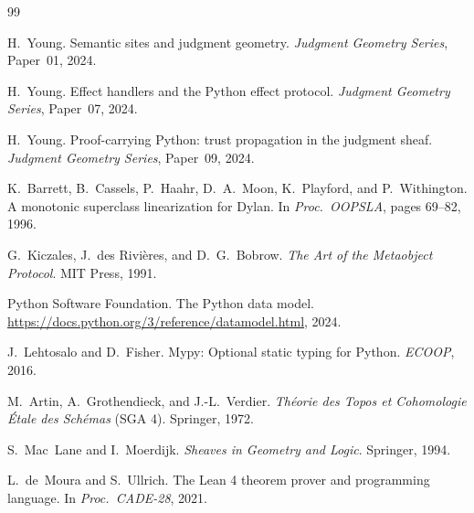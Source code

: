 \documentclass[11pt]{article}
\begin{document}
\begin{thebibliography}{99}

H.~Young.
\newblock Semantic sites and judgment geometry.
\newblock \textit{Judgment Geometry Series}, Paper~01, 2024.

H.~Young.
\newblock Effect handlers and the {Python} effect protocol.
\newblock \textit{Judgment Geometry Series}, Paper~07, 2024.

H.~Young.
\newblock Proof-carrying {Python}: trust propagation in the judgment sheaf.
\newblock \textit{Judgment Geometry Series}, Paper~09, 2024.

K.~Barrett, B.~Cassels, P.~Haahr, D.~A.~Moon, K.~Playford,
  and P.~Withington.
\newblock A monotonic superclass linearization for {Dylan}.
\newblock In \textit{Proc.\ OOPSLA}, pages 69--82, 1996.

G.~Kiczales, J.~des Rivi\`{e}res, and D.~G.~Bobrow.
\newblock \textit{The Art of the Metaobject Protocol}.
\newblock MIT Press, 1991.

{Python Software Foundation}.
\newblock The {Python} data model.
\newblock \url{https://docs.python.org/3/reference/datamodel.html}, 2024.

J.~Lehtosalo and D.~Fisher.
\newblock Mypy: Optional static typing for {Python}.
\newblock \textit{ECOOP}, 2016.

M.~Artin, A.~Grothendieck, and J.-L.~Verdier.
\newblock \textit{Th\'{e}orie des Topos et Cohomologie \'{E}tale des
  Sch\'{e}mas} ({SGA} 4).
\newblock Springer, 1972.

S.~Mac~Lane and I.~Moerdijk.
\newblock \textit{Sheaves in Geometry and Logic}.
\newblock Springer, 1994.

L.~de~Moura and S.~Ullrich.
\newblock The {Lean} 4 theorem prover and programming language.
\newblock In \textit{Proc.\ CADE-28}, 2021.

\end{thebibliography}
\end{document}
